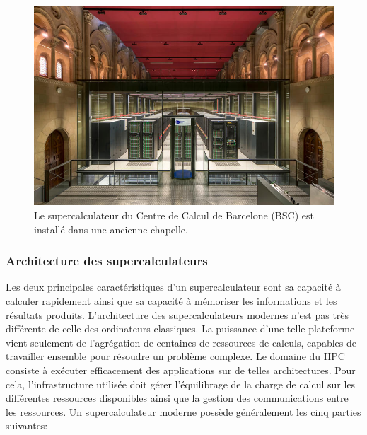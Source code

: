         
        \begin{figure}
        \center
        \includegraphics[width=12cm]{images/hpc_bsc_super.jpg}
        \caption{\label{fig:hpc_bsc_super} Le supercalculateur du Centre de Calcul de Barcelone (BSC) est installé dans une ancienne chapelle.}
        \end{figure}
        
        
    
        
    \subsubsection{Architecture des supercalculateurs}
    
        Les deux principales caractéristiques d'un supercalculateur sont sa capacité à calculer rapidement ainsi que sa capacité à mémoriser les informations et les résultats produits. L'architecture des supercalculateurs modernes n'est pas très différente de celle des ordinateurs classiques. La puissance d'une telle plateforme vient seulement de l'agrégation de centaines de ressources de calculs, capables de travailler ensemble pour résoudre un problème complexe. Le domaine du HPC consiste à exécuter efficacement des applications sur de telles architectures. Pour cela, l'infrastructure utilisée doit gérer l'équilibrage de la charge de calcul sur les différentes ressources disponibles ainsi que la gestion des communications entre les ressources. Un supercalculateur moderne possède généralement les cinq parties suivantes:
      
